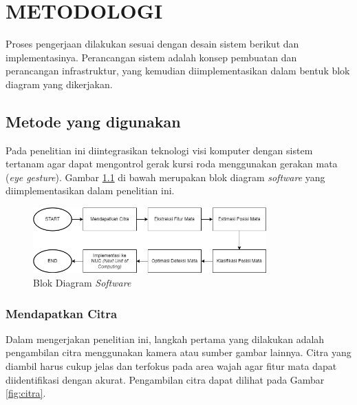 \chapter{METODOLOGI}
\label{chap:metodologi}


Proses pengerjaan dilakukan sesuai dengan desain sistem berikut dan implementasinya. Perancangan sistem adalah konsep pembuatan dan perancangan infrastruktur, yang kemudian diimplementasikan dalam bentuk blok diagram yang dikerjakan.

\section{Metode yang digunakan}
\label{sec:deskripsisistem}
Pada penelitian ini diintegrasikan teknologi visi komputer dengan sistem tertanam agar dapat mengontrol gerak kursi roda menggunakan gerakan mata (\emph{eye gesture}). Gambar \ref{fig:software} di bawah merupakan blok diagram \emph{software} yang diimplementasikan dalam penelitian ini.

\begin{figure} [H] \centering
  \includegraphics[width=0.8\textwidth]{gambar/bab3/software.png}
  \caption{Blok Diagram \textit{Software}}
  \label{fig:software}
\end{figure}

\subsection{Mendapatkan Citra}

Dalam mengerjakan penelitian ini, langkah pertama yang dilakukan adalah pengambilan citra menggunakan kamera atau sumber gambar lainnya. Citra yang diambil harus cukup jelas dan terfokus pada area wajah agar fitur mata dapat diidentifikasi dengan akurat. Pengambilan citra dapat dilihat pada Gambar \ref{fig:citra}.\\


